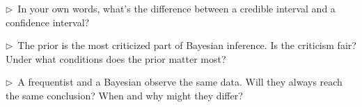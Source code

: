 \begin{reflect}
$\triangleright$~In your own words, what's the difference between a credible interval and a confidence interval?

\smallskip
$\triangleright$~The prior is the most criticized part of Bayesian inference. Is the criticism fair? Under what conditions does the prior matter most?

\smallskip
$\triangleright$~A frequentist and a Bayesian observe the same data. Will they always reach the same conclusion? When and why might they differ?
\end{reflect}
